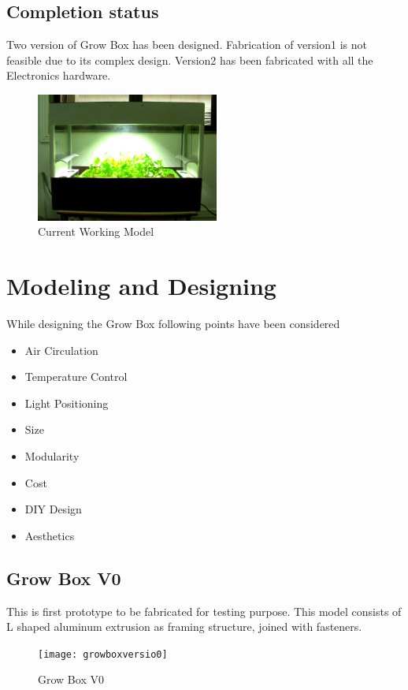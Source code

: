 \documentclass[a4paper,12pt,oneside]{book}
\begin{document}
\subsection*{Completion status}
Two version of Grow Box has been designed. Fabrication of version1 is not feasible due to its complex design. Version2 has been fabricated with all the Electronics hardware. \begin{figure}[h!]\begin{center}
  \includegraphics[width=170pt]{P1080888} 
  \caption{Current Working Model}
\end{center}\end{figure}

\section{Modeling and Designing}
While designing the Grow Box following points have been considered
\begin{itemize}
\item Air Circulation
\item Temperature Control
\item Light Positioning
\item Size
\item Modularity
\item Cost
\item DIY Design
\item Aesthetics
\end{itemize}

\subsection{Grow Box V0}
This is first prototype to be fabricated for testing purpose. This model consists of L shaped aluminum extrusion as framing structure, joined with fasteners. \\
\begin{figure}[h!]
  \begin{center}
\texttt{[image: growboxversio0]} 
\caption{Grow Box V0}
\end{center}
\end{figure}
\end{document}

